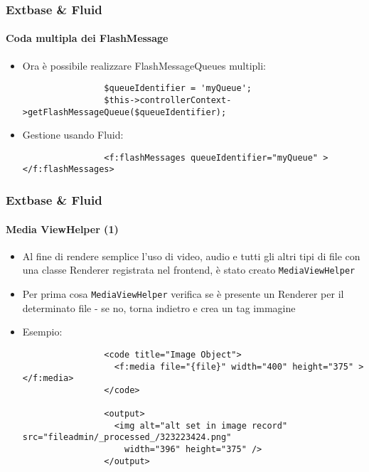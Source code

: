 \begin{frame}[fragile]
	\frametitle{Extbase \& Fluid}
	\framesubtitle{Coda multipla dei FlashMessage}

	\begin{itemize}

		\item Ora è possibile realizzare FlashMessageQueues multipli:

			\begin{lstlisting}
				$queueIdentifier = 'myQueue';
				$this->controllerContext->getFlashMessageQueue($queueIdentifier);
			\end{lstlisting}

		\item Gestione usando Fluid:

			\begin{lstlisting}
				<f:flashMessages queueIdentifier="myQueue" ></f:flashMessages>
			\end{lstlisting}

	\end{itemize}

\end{frame}


\begin{frame}[fragile]
	\frametitle{Extbase \& Fluid}
	\framesubtitle{Media ViewHelper (1)}

	\lstset{basicstyle=\tiny\ttfamily}

	\begin{itemize}

		\item Al fine di rendere semplice l'uso di video, audio e tutti gli altri tipi di file con
			una classe Renderer registrata nel frontend, è stato creato \texttt{MediaViewHelper}

		\item Per prima cosa \texttt{MediaViewHelper} verifica se è presente un Renderer per il determinato
			 file - se no, torna indietro e crea un tag immagine

		\item Esempio:

			\begin{lstlisting}
				<code title="Image Object">
				  <f:media file="{file}" width="400" height="375" ></f:media>
				</code>

				<output>
				  <img alt="alt set in image record" src="fileadmin/_processed_/323223424.png"
				    width="396" height="375" />
				</output>
			\end{lstlisting}

	\end{itemize}

\end{frame}

